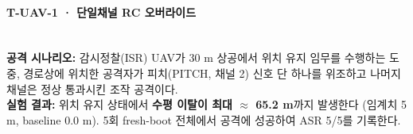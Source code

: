 \paragraph{\textbf{T-UAV-1 · 단일채널 RC 오버라이드}} ~\\
\textbf{공격 시나리오:} 
감시정찰(ISR) UAV가 30 m 상공에서 위치 유지 임무를 수행하는 도중, 경로상에 위치한 공격자가 피치(PITCH, 채널 2) 신호 단 하나를 위조하고 나머지 채널은 정상 통과시킨 조작 공격이다.
\\
\textbf{실험 결과:} 위치 유지 상태에서 \textbf{수평 이탈이 최대 $\approx$ 65.2 m}까지 발생한다 (임계치 5 m, baseline 0.0 m). 5회 fresh-boot 전체에서 공격에 성공하여 ASR 5/5를 기록한다.\\
